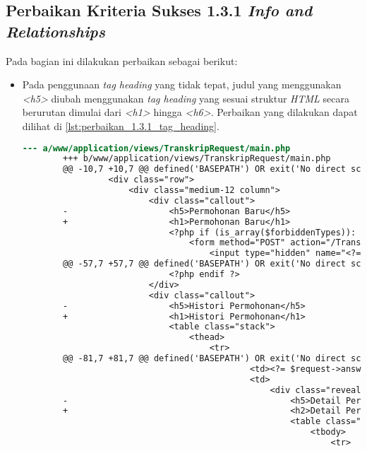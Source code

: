 \subsection{Perbaikan Kriteria Sukses 1.3.1 \textit{Info and Relationships}}
\label{subsec:perbaikan_kriteria_sukses_1.3.1}
Pada bagian ini dilakukan perbaikan sebagai berikut:

\begin{itemize}
    \item Pada penggunaan \textit{tag heading} yang tidak tepat, judul yang menggunakan \textit{<h5>} diubah menggunakan \textit{tag heading} yang sesuai struktur \textit{HTML} secara berurutan dimulai dari \textit{<h1>} hingga \textit{<h6>}. Perbaikan yang dilakukan dapat dilihat di \ref{lst:perbaikan_1.3.1_tag_heading}.
    \begin{lstlisting}[frame=single, label={lst:perbaikan_1.3.1_tag_heading}, language=diff, caption=Perbaikan Kriteria Sukses 1.3.1 - Penggunaan \textit{Heading} Tidak Tepat]
        --- a/www/application/views/TranskripRequest/main.php
        +++ b/www/application/views/TranskripRequest/main.php
        @@ -10,7 +10,7 @@ defined('BASEPATH') OR exit('No direct script access allowed');
                 <div class="row">
                     <div class="medium-12 column">
                         <div class="callout">
        -                    <h5>Permohonan Baru</h5>
        +                    <h1>Permohonan Baru</h1>
                             <?php if (is_array($forbiddenTypes)): ?>
                                 <form method="POST" action="/TranskripRequest/add">
                                     <input type="hidden" name="<?= $this->security->get_csrf_token_name() ?>" value="<?= $this->security->get_csrf_hash() ?>" />
        @@ -57,7 +57,7 @@ defined('BASEPATH') OR exit('No direct script access allowed');
                             <?php endif ?>
                         </div>
                         <div class="callout">
        -                    <h5>Histori Permohonan</h5>
        +                    <h1>Histori Permohonan</h1>
                             <table class="stack">
                                 <thead>
                                     <tr>
        @@ -81,7 +81,7 @@ defined('BASEPATH') OR exit('No direct script access allowed');
                                             <td><?= $request->answeredMessage ?></td>
                                             <td>
                                                 <div class="reveal" id="detail<?= $request->id ?>" data-reveal>
        -                                            <h5>Detail Permohonan #<?= $request->id ?></h5>
        +                                            <h2>Detail Permohonan #<?= $request->id ?></h2>
                                                     <table class="stack">
                                                         <tbody>
                                                             <tr>
        

\end{lstlisting}
\end{itemize}
